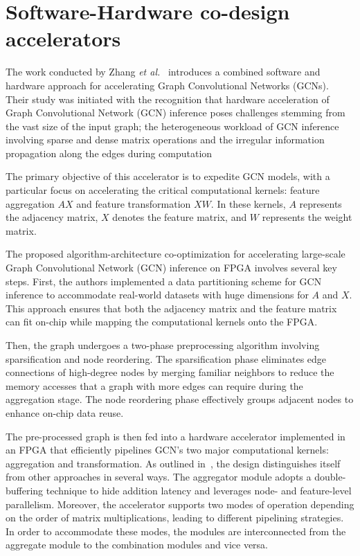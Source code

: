 \section{Software-Hardware co-design accelerators}
\label{sec:software-hardware-accelerators}%

The work conducted by Zhang \textit{et al.}~\cite{9153263} introduces a combined software and hardware approach for accelerating Graph Convolutional Networks (GCNs).
Their study was initiated with the recognition that hardware acceleration of Graph Convolutional Network (GCN) inference poses challenges stemming from the vast size of the input graph;
the heterogeneous workload of GCN inference involving sparse and dense matrix operations and the irregular information propagation along the edges during computation

The primary objective of this accelerator is to expedite GCN models, with a particular focus on accelerating the critical computational kernels: feature aggregation $AX$ and feature transformation $XW$.
In these kernels, $A$ represents the adjacency matrix, $X$ denotes the feature matrix, and $W$ represents the weight matrix.

The proposed algorithm-architecture co-optimization for accelerating large-scale Graph Convolutional Network (GCN) inference on FPGA involves several key steps.
First, the authors implemented a data partitioning scheme for GCN inference to accommodate real-world datasets with huge dimensions for $A$ and $X$.
This approach ensures that both the adjacency matrix and the feature matrix can fit on-chip while mapping the computational kernels onto the FPGA\@.

Then, the graph undergoes a two-phase preprocessing algorithm involving sparsification and node reordering. 
The sparsification phase eliminates edge connections of high-degree nodes by merging familiar neighbors to reduce the memory accesses that a graph with more edges can require during the aggregation stage.
The node reordering phase effectively groups adjacent nodes to enhance on-chip data reuse.

The pre-processed graph is then fed into a hardware accelerator implemented in an FPGA that efficiently pipelines GCN's two major computational kernels: aggregation and transformation.
As outlined in~\cite{DBLP:journals/corr/abs-2010-00130}, the design distinguishes itself from other approaches in several ways.
The aggregator module adopts a double-buffering technique to hide addition latency and leverages node- and feature-level parallelism.
Moreover, the accelerator supports two modes of operation depending on the order of matrix multiplications, leading to different pipelining strategies.
In order to accommodate these modes, the modules are interconnected from the aggregate module to the combination modules and vice versa.

